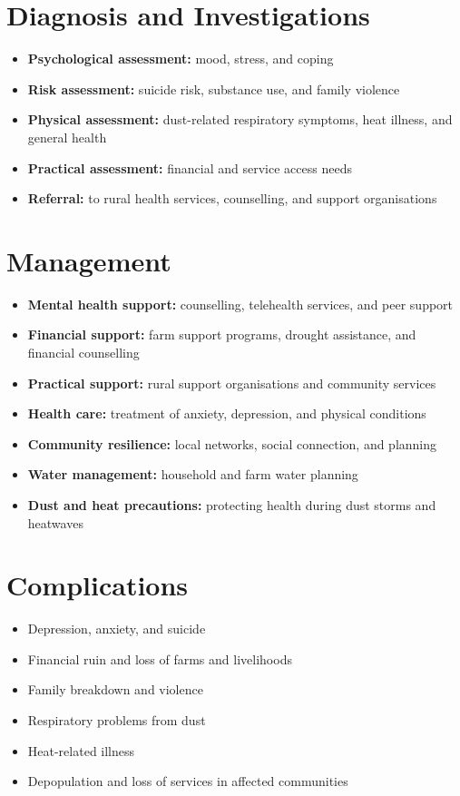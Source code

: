\section*{Diagnosis and Investigations}
\begin{itemize}
    \item \textbf{Psychological assessment:} mood, stress, and coping
    \item \textbf{Risk assessment:} suicide risk, substance use, and family violence
    \item \textbf{Physical assessment:} dust-related respiratory symptoms, heat illness, and general health
    \item \textbf{Practical assessment:} financial and service access needs
    \item \textbf{Referral:} to rural health services, counselling, and support organisations
\end{itemize}

\section*{Management}
\begin{itemize}
    \item \textbf{Mental health support:} counselling, telehealth services, and peer support
    \item \textbf{Financial support:} farm support programs, drought assistance, and financial counselling
    \item \textbf{Practical support:} rural support organisations and community services
    \item \textbf{Health care:} treatment of anxiety, depression, and physical conditions
    \item \textbf{Community resilience:} local networks, social connection, and planning
    \item \textbf{Water management:} household and farm water planning
    \item \textbf{Dust and heat precautions:} protecting health during dust storms and heatwaves
\end{itemize}

\section*{Complications}
\begin{itemize}
    \item Depression, anxiety, and suicide
    \item Financial ruin and loss of farms and livelihoods
    \item Family breakdown and violence
    \item Respiratory problems from dust
    \item Heat-related illness
    \item Depopulation and loss of services in affected communities
\end{itemize}

